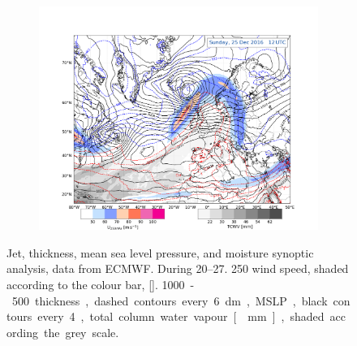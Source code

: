 \begin{figure}
\begin{subfigure}[b]{0.49\textwidth}
    \end{subfigure}
    \begin{subfigure}[b]{\textwidth}
        \includegraphics[trim={4.2cm 0cm 4.3cm 36.8cm},clip,
        width=\textwidth]{./fig_Geopot_Jet/20161225_12}
    \end{subfigure}
    \caption{Jet, thickness, mean sea level pressure, and moisture synoptic analysis, data from ECMWF. During \SIrange{20}{27}{\dec}. \SI{250}{\hPa} wind speed, shaded according to the colour bar, [\SI{}{\mPs}]. \SI{1000}-\SI{500}{\hPa} thickness, dashed contours every \SI{6}{\deca\meter}, MSLP, black contours every \SI{4}{\hPa}, total column water vapour [\SI{}{\mm}], shaded according the grey scale.}\label{fig:GeopJet}
\end{figure}